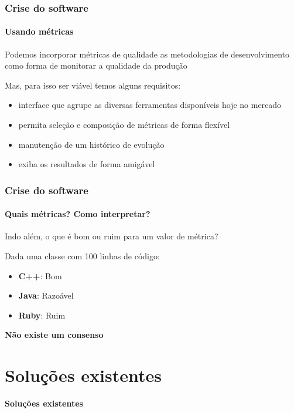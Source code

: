 \documentclass{beamer}
\begin{document}
\begin{frame}
  \frametitle{Crise do software}
  \framesubtitle{Usando métricas}

  Podemos incorporar métricas de qualidade as metodologias de desenvolvimento como forma de monitorar a qualidade da produção

  Mas, para isso ser viável temos alguns requisitos:
  \begin{itemize}
    \item interface que agrupe as diversas ferramentas disponíveis hoje no mercado
    \item permita seleção e composição de métricas de forma flexível
    \item manutenção de um histórico de evolução
    \item exiba os resultados de forma amigável
  \end{itemize}
\end{frame}

\begin{frame}
  \frametitle{Crise do software}
  \framesubtitle{Quais métricas? Como interpretar?}

  Indo além, o que é bom ou ruim para um valor de métrica?

  Dada uma classe com 100 linhas de código:
  \begin{itemize}
    \item \textbf{C++}: Bom
    \item \textbf{Java}: Razoável
    \item \textbf{Ruby}: Ruim
  \end{itemize}

  \textbf{Não existe um consenso}
\end{frame}

\section{Soluções existentes}
\begin{frame}
  \LARGE{\textbf{Soluções existentes}}
\end{frame}
\end{document}
